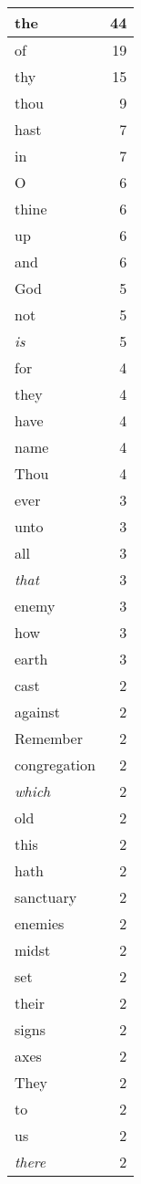 \begin{center}
\begin{longtable}{l|r}
\hline \hline
\endlastfoot
the & 44 \\ \hline
of & 19 \\ \hline
thy & 15 \\ \hline
thou & 9 \\ \hline
hast & 7 \\ \hline
in & 7 \\ \hline
O & 6 \\ \hline
thine & 6 \\ \hline
up & 6 \\ \hline
and & 6 \\ \hline
God & 5 \\ \hline
not & 5 \\ \hline
\emph{is} & 5 \\ \hline
for & 4 \\ \hline
they & 4 \\ \hline
have & 4 \\ \hline
name & 4 \\ \hline
Thou & 4 \\ \hline
ever & 3 \\ \hline
unto & 3 \\ \hline
all & 3 \\ \hline
\emph{that} & 3 \\ \hline
enemy & 3 \\ \hline
how & 3 \\ \hline
earth & 3 \\ \hline
cast & 2 \\ \hline
against & 2 \\ \hline
Remember & 2 \\ \hline
congregation & 2 \\ \hline
\emph{which} & 2 \\ \hline
old & 2 \\ \hline
this & 2 \\ \hline
hath & 2 \\ \hline
sanctuary & 2 \\ \hline
enemies & 2 \\ \hline
midst & 2 \\ \hline
set & 2 \\ \hline
their & 2 \\ \hline
signs & 2 \\ \hline
axes & 2 \\ \hline
They & 2 \\ \hline
to & 2 \\ \hline
us & 2 \\ \hline
\emph{there} & 2 \\ \hline

\end{longtable}
\end{center}
